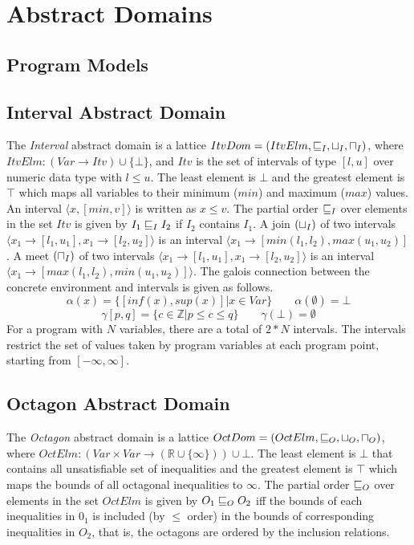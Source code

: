 \section{Abstract Domains}
\subsection{Program Models}

\subsection{Interval Abstract Domain}
The {\em Interval} abstract domain is a lattice 
$ItvDom = (ItvElm, \sqsubseteq_{I}, \sqcup_{I}, \sqcap_{I})$, where
$ItvElm: (Var \rightarrow Itv) \cup \{\bot\}$, and $Itv$ is 
the set of intervals of type $[l,u]$ over numeric data 
type with $l \leq u$. The least element is $\bot$ and the 
greatest element is $\top$ which maps all variables to their
minimum ($min$) and maximum ($max$) values.  An interval 
$\langle x, [min, v] \rangle$ is written as $x \leq v$.  The 
partial order $\sqsubseteq_{I}$ over elements in the set $Itv$ is 
given by $I_1 \sqsubseteq_{I} I_2$ if $I_2$ contains $I_1$.
A join $(\sqcup_{I})$ of two intervals $\langle x_1 \rightarrow [l_1, u_1], 
x_1 \rightarrow [l_2, u_2] \rangle$ is an interval 
$\langle x_1 \rightarrow [min(l_1, l_2), max(u_1, u_2)]$.
A meet $(\sqcap_{I})$ of two intervals $\langle x_1 \rightarrow [l_1, u_1], 
x_1 \rightarrow [l_2, u_2] \rangle$ is an interval 
$\langle x_1 \rightarrow [max(l_1, l_2), min(u_1, u_2)] \rangle$.
The galois connection between the concrete environment and intervals is 
given as follows.
\[\alpha(x) = \{[inf(x), sup(x)] | x \in Var\} \qquad   \alpha(\emptyset) = \bot \]
\[\gamma[p,q] = \{c \in \mathbb{Z} | p \leq c \leq q\} \qquad \gamma(\bot) = \emptyset \]
For a program with $N$ variables, there are a total of 
$2*N$ intervals. The intervals restrict the set of values 
taken by program variables at each program point, starting 
from $[-\infty, \infty]$.   

\subsection{Octagon Abstract Domain}
The {\em Octagon} abstract domain is a lattice 
$OctDom = (OctElm, \sqsubseteq_{O}, \sqcup_{O}, \sqcap_{O})$, where
$OctElm: (Var \times Var \rightarrow (\mathbb{R} \cup \{\infty\})) \cup \bot$. 
The least element is $\bot$ that contains all unsatisfiable 
set of inequalities and the greatest element is $\top$ which 
maps the bounds of all octagonal inequalities to $\infty$. 
The partial order $\sqsubseteq_{O}$ over elements in the set $OctElm$ is 
given by $O_1 \sqsubseteq_{O} O_2$ iff the bounds of each inequalities in $0_1$ 
is included (by $\leq$ order) in the bounds of corresponding inequalities 
in $O_2$, that is, the octagons are ordered by the inclusion relations.

